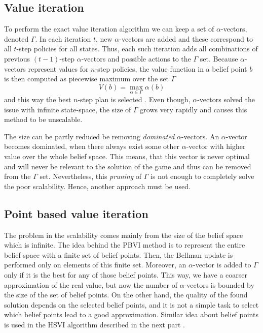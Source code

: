 \documentclass[../main.tex]{subfiles}
\begin{document}
\subsection{Value iteration}\label{standard:pomdp:valueit}
To perform the exact value iteration algorithm we can keep a set of $\alpha$-vectors, denoted $\Gamma$.
In each iteration $t$, new $\alpha$-vectors are added and these correspond to all $t$-step policies for all states.
Thus, each such iteration adds all combinations of previous $(t-1)$-step $\alpha$-vectors and possible actions to the $\Gamma$ set.
Because $\alpha$-vectors represent values for $n$-step policies, the value function in a belief point $b$ is then computed as piecewise maximum over the set $\Gamma$
\begin{equation}\label{standard:pomdp:valuefun}
    V(b) = \max_{\alpha \in \Gamma}\alpha(b)
\end{equation}
and this way the best $n$-step plan is selected \cite{poposgsthesis}.
Even though, $\alpha$-vectors solved the issue with infinite state-space, the size of $\Gamma$ grows very rapidly and causes this method to be unscalable.

The size can be partly reduced be removing \textit{dominated} $\alpha$-vectors.
An $\alpha$-vector becomes dominated, when there always exist some other $\alpha$-vector with higher value over the whole belief space.
This means, that this vector is never optimal and will never be relevant to the solution of the game and thus can be removed from the $\Gamma$ set.
Nevertheless, this \textit{pruning} of $\Gamma$ is not enough to completely solve the poor scalability.
Hence, another approach must be used.

\subsection{Point based value iteration}\label{standard:pomdp:pbvi}
The problem in the scalability comes mainly from the size of the belief space which is infinite.
The idea behind the PBVI method is to represent the entire belief space with a finite set of belief points.
Then, the Bellman update is performed only on elements of this finite set.
Moreover, an $\alpha$-vector is added to $\Gamma$ only if it is the best for any of those belief points.
This way, we have a coarser approximation of the real value, but now the number of $\alpha$-vectors is bounded by the size of the set of belief points.
On the other hand, the quality of the found solution depends on the selected belief points, and it is not a simple task to select which belief points lead to a good approximation.
Similar idea about belief points is used in the HSVI algorithm described in the next part .
\end{document}

